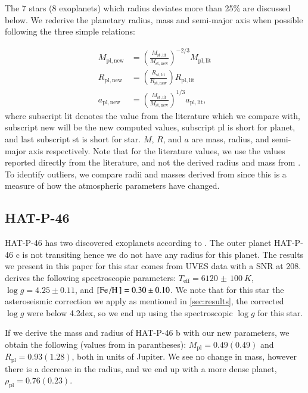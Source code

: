 \documentclass{aa}
\begin{document}
The 7 stars (8 exoplanets) which radius deviates more than 25\% are discussed
below. We rederive the planetary radius, mass and semi-major axis when possible
following the three simple relations:

\begin{align}
    M_\mathrm{pl,new} &= \left(\frac{M_\mathrm{st,lit}}{M_\mathrm{st,new}}\right)^{-2/3} M_\mathrm{pl,lit}  \\
    R_\mathrm{pl,new} &= \left(\frac{R_\mathrm{st,lit}}{R_\mathrm{st,new}}\right) R_\mathrm{pl,lit} \\
    a_\mathrm{pl,new} &= \left(\frac{M_\mathrm{st,lit}}{M_\mathrm{st,new}}\right)^{1/3} a_\mathrm{pl,lit},
\end{align}
where subscript lit denotes the value from the literature which we compare with,
subscript new will be the new computed values, subscript pl is short for planet,
and last subscript st is short for star. $M$, $R$, and $a$ are mass, radius, and
semi-major axis respectively. Note that for the literature values, we use the
values reported directly from the literature, and not the derived radius and
mass from \citet{Torres2010}. To identify outliers, we compare radii and masses
derived from \citet{Torres2010} since this is a measure of how the atmospheric
parameters have changed.

\subsection{HAT-P-46}
\label{sub:HAT-P-46}
HAT-P-46 has two discovered exoplanets according to \citet{Hartmann2014}. The
outer planet HAT-P-46 c is not transiting hence we do not have any radius for
this planet. The results we present in this paper for this star comes from UVES
data with a SNR at 208. \citet{Hartmann2014} derives the following spectroscopic
parameters: $T_\mathrm{eff}=\SI{6120(100)}{K}$, $\log g=4.25\pm0.11$, and
$[\ion{Fe}/\ion{H}]=0.30\pm0.10$. We note that for this star the asteroseismic
correction we apply as mentioned in \ref{sec:results}, the corrected $\log g$
were below 4.2dex, so we end up using the spectroscopic $\log g$ for this star.

If we derive the mass and radius of HAT-P-46 b with our new parameters, we
obtain the following (values from \citet{Hartmann2014} in parantheses):
$M_\mathrm{pl} = 0.49(0.49)$ and $R_\mathrm{pl} = 0.93(1.28)$, both in units
of Jupiter. We see no change in mass, however there is a decrease in the radius,
and we end up with a more dense planet, $\rho_\mathrm{pl} = 0.76(0.23)$.
\end{document}
